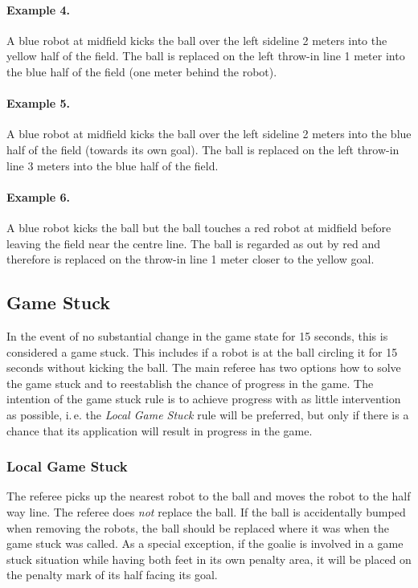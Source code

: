 \documentclass[12pt]{article}
\newcommand{\ie}{\mbox{i.\,e.}\xspace}
\begin{document}
\paragraph{Example 4.} A blue robot at midfield kicks the ball over the left sideline 2 meters into the yellow half of the field. The ball is replaced on the left throw-in line 1 meter into the blue half of the field (one meter behind the robot).

\paragraph{Example 5.} A blue robot at midfield kicks the ball over the left sideline 2 meters into the blue half of the field (towards its own goal). The ball is replaced on the left throw-in line 3 meters into the blue half of the field.

\paragraph{Example 6.} A blue robot kicks the ball but the ball touches a red robot at midfield before leaving the field near the centre line. The ball is regarded as out by red and therefore is replaced on the throw-in line 1 meter closer to the yellow goal.


\subsection{Game Stuck}
\label{sec:game_stuck}

In the event of no substantial change in the game state for 15 seconds, this is considered a game stuck. 
This includes if a robot is at the ball circling it for 15 seconds without kicking the ball.
The main referee has two options how to solve the game stuck and to reestablish the chance of progress in the game. The intention of the game stuck rule is to achieve progress with as little intervention as possible, \ie the \emph{Local Game Stuck} rule will be preferred, but only if there is a chance that its application will result in progress in the game.

\subsubsection{Local Game Stuck}

The referee picks up the nearest robot to the ball and moves the robot to the half way line. The referee does \emph{not} replace the ball. If the ball is accidentally bumped when removing the robots, the ball should be replaced where it was when the game stuck was called. As a special exception, if the goalie is involved in a game stuck situation while having both feet in its own penalty area, it will be placed on the penalty mark of its half facing its goal.
\end{document}
